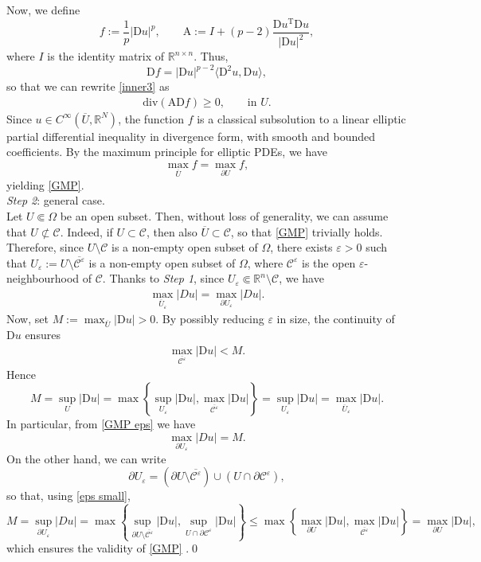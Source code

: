 \documentclass[a4paper,11pt]{article}
\numberwithin{equation}{section}
\newcommand{\numberset}{\mathbb}
\newcommand{\eps}{\varepsilon}
\newcommand{\Om}{\Omega}
\newcommand{\R}{\numberset{R}}
\newcommand{\rom}{\mathrm}
\theoremstyle{definition}
\begin{document}
Now, we define 
$$
f:=\frac1p{|\rom Du|^p}, \qquad \rom A:= I+(p-2)\frac{\rom Du^\rom T\rom Du}{|\rom Du|^2},
$$
where $I$ is the identity matrix of $\R^{n\times n}$. Thus, 
$$
\rom Df=|\rom Du|^{p-2}\langle\rom D^2u, \rom Du\rangle,
$$
so that we can rewrite \eqref{inner3} as
\begin{equation}\label{inner4}
\begin{aligned}
\rom{div}(\rom A\rom Df)\geq0, \qquad\mbox{in }U.
\end{aligned}
\end{equation}
Since $u\in C^\infty(\overline U,\R^N)$, the function $f$ is a classical subsolution to a linear elliptic partial differential inequality in divergence form, with smooth and bounded coefficients. By the maximum principle for elliptic PDEs, we have
$$
\max_{\overline U}f=\max_{\partial U}f,
$$
yielding \eqref{GMP}.\\

\noindent
\textit{Step 2}: general case.\\
Let $U\Subset\Om$ be an open subset. Then, without loss of generality, we can assume that $U\not\subset\mathscr C$. Indeed, if $U\subset\mathscr C$, then also $\overline U\subset\mathscr C$, so that \eqref{GMP} trivially holds. Therefore, since $U\setminus \mathscr C$ is a non-empty open subset of $\Om$, there exists $\eps>0$ such that $U_\eps:=U\setminus\overline{\mathscr C^\eps}$ is a non-empty open subset of $\Om$, where ${\mathscr C^\eps}$ is the open $\eps$-neighbourhood of ${\mathscr C}$. Thanks to \textit{Step 1}, since $U_\eps\Subset\R^n\setminus \mathscr C$, we have
\begin{align}\label{GMP eps}
\max_{\overline U_\eps}|Du|=\max_{\partial U_\eps}|Du|.
\end{align}
Now, set $M:=\max_{\overline U}|\rom Du|>0$. By possibly reducing $\eps$ in size, the continuity of $\rom Du$ ensures
\begin{align}\label{eps small}
\max_{\overline{\mathscr C^\eps}}|\rom Du|< M.
\end{align}
Hence
$$
M=\sup_{U}|\rom Du|=\max\left\{\sup_{U_\eps}|\rom Du|,\max_{\overline{\mathscr C^\eps}}|\rom Du| \right\}=\sup_{U_\eps}|\rom Du|= \max_{ \overline{U}_\eps}|\rom Du|.
$$
In particular, from \eqref{GMP eps} we have
$$
\max_{\partial U_\eps}|Du|=M.
$$
On the other hand, we can write
$$
\partial U_\eps=(\partial U\setminus\overline{\mathscr C^\eps})\cup (U\cap \partial{\mathscr C^\eps}),
$$
so that, using \eqref{eps small}, 
$$
M=\sup_{\partial U_\eps}|Du|=\max\left\{\sup_{\partial U\setminus\overline{\mathscr C^\eps}}|\rom Du|, \sup_{U\cap \partial{\mathscr C^\eps}}|\rom Du|\right\}\leq\max\left\{\max_{\partial U}|\rom Du|, \max_{ \overline{\mathscr C^\eps}}|\rom Du|\right\}=\max_{\partial U}|\rom Du|,
$$
which ensures the validity of \eqref{GMP} .\qed\\
\end{document}
